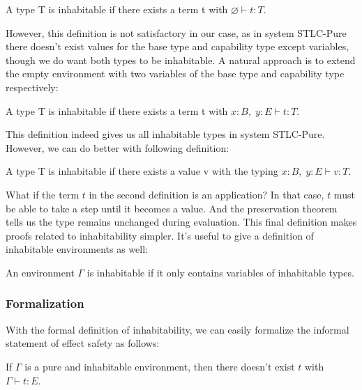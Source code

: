 \begin{definition}
  A type T is inhabitable if there exists a term t with $\varnothing
  \vdash t : T$.
\end{definition}

However, this definition is not satisfactory in our case, as in system
STLC-Pure there doesn't exist values for the base type and capability
type except variables, though we do want both types to be
inhabitable. A natural approach is to extend the empty environment
with two variables of the base type and capability type respectively:

\begin{definition}
  A type T is inhabitable if there exists a term t with
  $x:B,\; y:E \vdash t : T$.
\end{definition}

This definition indeed gives us all inhabitable types in system
STLC-Pure. However, we can do better with following definition:

\begin{definition}
  A type T is inhabitable if there exists a value v with the typing
  $x:B,\; y:E \vdash v : T$.
\end{definition}

What if the term $t$ in the second definition is an application? In
that case, $t$ must be able to take a step until it becomes a
value. And the preservation theorem tells us the type remains
unchanged during evaluation. This final definition makes proofs
related to inhabitability simpler. It's useful to give a definition of
inhabitable environments as well:

\begin{definition}
  An environment $\Gamma$ is inhabitable if it only contains variables
  of inhabitable types.
\end{definition}

\subsubsection{Formalization}

With the formal definition of inhabitability, we can easily formalize
the informal statement of effect safety as follows:

\begin{definition}
  If $\Gamma$ is a pure and inhabitable environment, then there
  doesn't exist $t$ with $\Gamma \vdash t : E$.
\end{definition}

